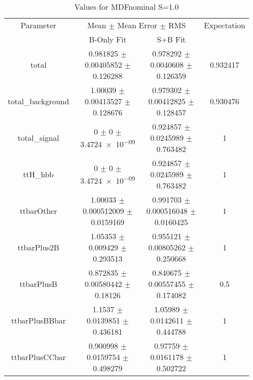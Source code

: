\begin{table}
\centering
\caption{Values for MDFnominal S=1.0}
\begin{tabular}{cccc}
\toprule
Parameter & \multicolumn{2}{c}{Mean $\pm$ Mean Error $\pm$ RMS} & Expectation\\
 & B-Only Fit & S+B Fit & \\
\midrule
total & \num{0.981825} $\pm$ \num{0.00405852} $\pm$ \num{0.126288} & \num{0.978292} $\pm$ \num{0.0040608} $\pm$ \num{0.126359} & \num{0.932417}\\
total\_background & \num{1.00039} $\pm$ \num{0.00413527} $\pm$ \num{0.128676} & \num{0.979302} $\pm$ \num{0.00412825} $\pm$ \num{0.128457} & \num{0.930476}\\
total\_signal & \num{0} $\pm$ \num{0} $\pm$ \num{3.4724e-09} & \num{0.924857} $\pm$ \num{0.0245989} $\pm$ \num{0.763482} & \num{1}\\
ttH\_hbb & \num{0} $\pm$ \num{0} $\pm$ \num{3.4724e-09} & \num{0.924857} $\pm$ \num{0.0245989} $\pm$ \num{0.763482} & \num{1}\\
ttbarOther & \num{1.00033} $\pm$ \num{0.000512009} $\pm$ \num{0.0159169} & \num{0.991703} $\pm$ \num{0.000516048} $\pm$ \num{0.0160425} & \num{1}\\
ttbarPlus2B & \num{1.05353} $\pm$ \num{0.009429} $\pm$ \num{0.293513} & \num{0.955121} $\pm$ \num{0.00805262} $\pm$ \num{0.250668} & \num{1}\\
ttbarPlusB & \num{0.872835} $\pm$ \num{0.00580442} $\pm$ \num{0.18126} & \num{0.840675} $\pm$ \num{0.00557455} $\pm$ \num{0.174082} & \num{0.5}\\
ttbarPlusBBbar & \num{1.1537} $\pm$ \num{0.0139851} $\pm$ \num{0.436181} & \num{1.05989} $\pm$ \num{0.0142611} $\pm$ \num{0.444788} & \num{1}\\
ttbarPlusCCbar & \num{0.900998} $\pm$ \num{0.0159754} $\pm$ \num{0.498279} & \num{0.97759} $\pm$ \num{0.0161178} $\pm$ \num{0.502722} & \num{1}\\
\bottomrule
\end{tabular}
\end{table}